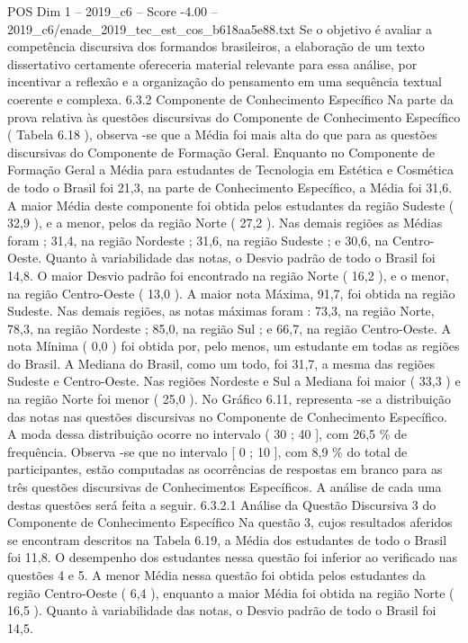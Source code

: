\begin{textsample}{POS Dim 1 – 2019\_c6 – Score -4.00 – 2019\_c6/enade\_2019\_tec\_est\_cos\_b618aa5e88.txt}
Se o objetivo é avaliar a competência discursiva dos formandos brasileiros, a elaboração de um texto dissertativo certamente ofereceria material relevante para essa análise, por incentivar a reflexão e a organização do pensamento em uma sequência textual coerente e complexa. 6.3.2 Componente de Conhecimento Específico Na parte da prova relativa às questões discursivas do Componente de Conhecimento Específico ( Tabela 6.18 ), observa -se que a Média foi mais alta do que para as questões discursivas do Componente de Formação Geral.
Enquanto no Componente de Formação Geral a Média para estudantes de Tecnologia em Estética e Cosmética de todo o Brasil foi 21,3, na parte de Conhecimento Específico, a Média foi 31,6.
A maior Média deste componente foi obtida pelos estudantes da região Sudeste ( 32,9 ), e a menor, pelos da região Norte ( 27,2 ).
Nas demais regiões as Médias foram ; 31,4, na região Nordeste ; 31,6, na região Sudeste ; e 30,6, na Centro-Oeste.
Quanto à variabilidade das notas, o Desvio padrão de todo o Brasil foi 14,8.
O maior Desvio padrão foi encontrado na região Norte ( 16,2 ), e o menor, na região Centro-Oeste ( 13,0 ).
A maior nota Máxima, 91,7, foi obtida na região Sudeste.
Nas demais regiões, as notas máximas foram : 73,3, na região Norte, 78,3, na região Nordeste ; 85,0, na região Sul ; e 66,7, na região Centro-Oeste.
A nota Mínima ( 0,0 ) foi obtida por, pelo menos, um estudante em todas as regiões do Brasil.
A Mediana do Brasil, como um todo, foi 31,7, a mesma das regiões Sudeste e Centro-Oeste.
Nas regiões Nordeste e Sul a Mediana foi maior ( 33,3 ) e na região Norte foi menor ( 25,0 ).
No Gráfico 6.11, representa -se a distribuição das notas nas questões discursivas no Componente de Conhecimento Específico.
A moda dessa distribuição ocorre no intervalo ( 30 ; 40 ], com 26,5 \% de frequência.
Observa -se que no intervalo [ 0 ; 10 ], com 8,9 \% do total de participantes, estão computadas as ocorrências de respostas em branco para as três questões discursivas de Conhecimentos Específicos.
A análise de cada uma destas questões será feita a seguir. 6.3.2.1 Análise da Questão Discursiva 3 do Componente de Conhecimento Específico Na questão 3, cujos resultados aferidos se encontram descritos na Tabela 6.19, a Média dos estudantes de todo o Brasil foi 11,8.
O desempenho dos estudantes nessa questão foi inferior ao verificado nas questões 4 e 5.
A menor Média nessa questão foi obtida pelos estudantes da região Centro-Oeste ( 6,4 ), enquanto a maior Média foi obtida na região Norte ( 16,5 ).
Quanto à variabilidade das notas, o Desvio padrão de todo o Brasil foi 14,5.

\end{textsample}
